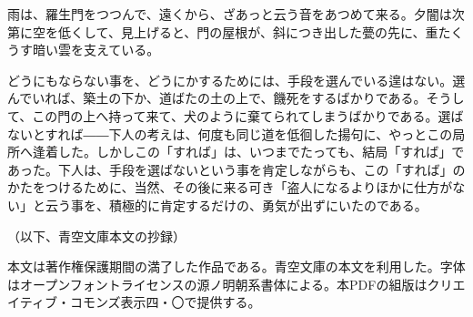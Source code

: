 \documentclass[tate,book,paper=a4]{jlreq}
\begin{document}
雨は、羅生門をつつんで、遠くから、ざあっと云う音をあつめて来る。夕闇は次第に空を低くして、見上げると、門の屋根が、斜につき出した甍の先に、重たくうす暗い雲を支えている。\par
どうにもならない事を、どうにかするためには、手段を選んでいる遑はない。選んでいれば、築土の下か、道ばたの土の上で、饑死をするばかりである。そうして、この門の上へ持って来て、犬のように棄てられてしまうばかりである。選ばないとすれば――下人の考えは、何度も同じ道を低徊した揚句に、やっとこの局所へ逢着した。しかしこの「すれば」は、いつまでたっても、結局「すれば」であった。下人は、手段を選ばないという事を肯定しながらも、この「すれば」のかたをつけるために、当然、その後に来る可き「盗人になるよりほかに仕方がない」と云う事を、積極的に肯定するだけの、勇気が出ずにいたのである。\par
（以下、青空文庫本文の抄録）\par
本文は著作権保護期間の満了した作品である。青空文庫の本文を利用した。字体はオープンフォントライセンスの源ノ明朝系書体による。本PDFの組版はクリエイティブ・コモンズ表示四・〇で提供する。\par
\end{document}
